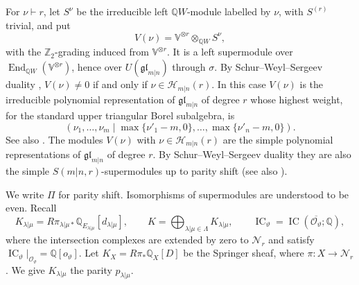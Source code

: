\documentclass[11pt,a4paper]{amsart}
\theoremstyle{definition}
\theoremstyle{remark}
\newcommand{\Q}{\mathbb Q}
\newcommand{\N}{\mathcal N}
\newcommand{\IC}{\operatorname{IC}}
\newcommand{\End}{\operatorname{End}}
\newcommand{\lm}{\lambda|\mu}
\numberwithin{equation}{section}
\begin{document}
For $\nu\vdash r$, let $S^\nu$ be the irreducible left $\Q W$-module
labelled by $\nu$, with $S^{(r)}$ trivial, and put
\begin{equation}\label{eq:covariant-module}
V(\nu)=\mathbb V^{\otimes r}\otimes_{\Q W}S^\nu,
\end{equation}
with the $\mathbb Z_2$-grading induced from $\mathbb V^{\otimes r}$. It is
a left supermodule over $\End_{\Q W}(\mathbb V^{\otimes r})$, hence over
$U(\mathfrak{gl}_{m|n})$ through $\sigma$. By Schur--Weyl--Sergeev duality
\cite{Ser,BR}, $V(\nu)\neq0$ if and only if
$\nu\in\mathcal H_{m|n}(r)$. In this case $V(\nu)$ is the irreducible
polynomial representation of $\mathfrak{gl}_{m|n}$ of degree $r$ whose
highest weight, for the standard upper triangular Borel subalgebra, is
\begin{equation}\label{eq:geometric-highest-weight}
(\nu_1,\ldots,\nu_m\mid
 \max\{\nu'_1-m,0\},\ldots,\max\{\nu'_n-m,0\}).
\end{equation}
See also \cite[Section~2]{Molev}. The modules $V(\nu)$ with
$\nu\in\mathcal H_{m|n}(r)$ are the simple polynomial representations of
$\mathfrak{gl}_{m|n}$ of degree $r$. By Schur--Weyl--Sergeev duality they are
also the simple $S(m|n,r)$-supermodules up to parity shift
(see also \cite{Don,BK,HKN}).

We write $\Pi$ for parity shift. Isomorphisms of supermodules are
understood to be even. Recall
$$
K_{\lm}=R\pi_{\lm*}\Q_{E_{\lm}}[d_{\lm}],
\qquad K=\bigoplus_{\lm\in\Lambda}K_{\lm},
\qquad \IC_\vartheta=\IC(\overline{\mathcal O_\vartheta};\Q),
$$
where the intersection complexes are extended by zero to $\N_r$ and
satisfy $\IC_\vartheta|_{\mathcal O_\vartheta}=\Q[o_\vartheta]$.
Let $K_X=R\pi_*\Q_X[D]$ be the Springer sheaf, where $\pi:X\to\N_r$.
We give $K_{\lm}$ the parity $p_{\lm}$.
\end{document}
